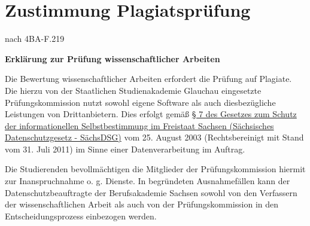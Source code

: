 \newpage
\section{Zustimmung Plagiatsprüfung}

\vspace*{2mm}

\begin{minipage}{0.5\columnwidth}

\end{minipage}
\begin{minipage}{0.45\columnwidth}
\begin{flushright}
{\small nach 4BA-F.219\\}
\end{flushright}
\end{minipage}
\vspace*{2mm}

\begin{center}\textbf{\huge{Erklärung zur Prüfung wissenschaftlicher Arbeiten}}\end{center}

Die Bewertung wissenschaftlicher Arbeiten erfordert die Prüfung auf Plagiate. Die hierzu von der Staatlichen Studienakademie Glauchau eingesetzte Prüfungskommission nutzt sowohl eigene Software als auch diesbezügliche Leistungen von Drittanbietern. Dies erfolgt gemäß \href{https://www.revosax.sachsen.de/vorschrift/1672-Saechsisches-Datenschutzgesetz#p7}{§ 7 des Gesetzes zum Schutz der informationellen Selbstbestimmung im Freistaat Sachsen (Sächsisches Datenschutzgesetz - SächsDSG)} vom 25. August 2003 (Rechtsbereinigt mit Stand vom 31. Juli 2011) im Sinne einer Datenverarbeitung im Auftrag.

Die Studierenden bevollmächtigen die Mitglieder der Prüfungskommission hiermit zur Inanspruchnahme o. g. Dienste. In begründeten Ausnahmefällen kann der Datenschutzbeauftragte der Berufsakademie Sachsen sowohl von den Verfassern der wissenschaftlichen Arbeit als auch von der Prüfungskommission in den Entscheidungsprozess einbezogen werden.

\arrayrulewidth=0.5pt

